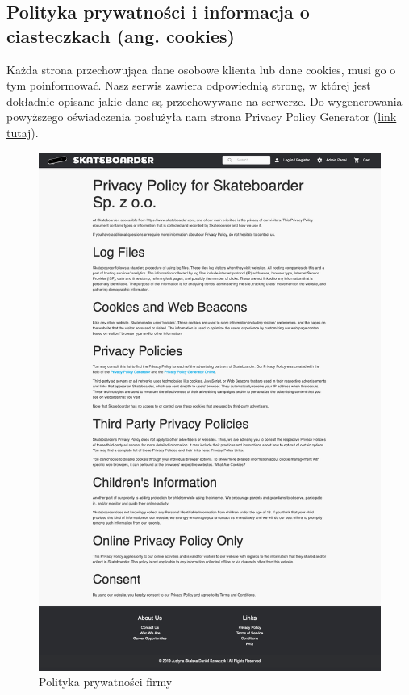 \documentclass[12pt,a4paper,titlepage]{article}
\begin{document}
\subsection{Polityka prywatności i informacja o ciasteczkach (ang. cookies)}
Każda strona przechowująca dane osobowe klienta lub dane cookies, musi go o tym poinformować. Nasz serwis zawiera odpowiednią stronę, w której jest dokładnie opisane jakie dane są przechowywane na serwerze. Do wygenerowania powyższego oświadczenia posłużyła nam strona Privacy Policy Generator \hyperlink{https://www.privacypolicygenerator.info}{(link tutaj)}.
\begin{figure}[H]
    \centering
    \includegraphics[width=13cm]{Pics/privacy.png}
    \caption{Polityka prywatności firmy}
    \label{pic:privacy}
\end{figure}
\end{document}
